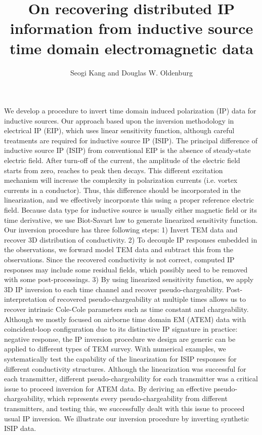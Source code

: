 \documentclass[extra,mreferee]{gji}
\author{Seogi Kang and Douglas W. Oldenburg}
\title{On recovering distributed IP information from inductive source time domain electromagnetic data}
\begin{document}
\label{firstpage}

\maketitle

\begin{summary}
We develop a procedure to invert time domain induced polarization (IP) data for inductive sources. 
Our approach based upon the inversion methodology in electrical IP (EIP), which uses linear sensitivity function, although careful treatments are required for inductive source IP (ISIP). 
The principal difference of inductive source IP (ISIP) from conventional EIP is the absence of steady-state electric field. 
After turn-off of the current, the amplitude of the electric field starts from zero, reaches to peak then decays. 
This different excitation mechanism will increase the complexity in polarization currents (i.e. vortex currents in a conductor).
Thus, this difference should be incorporated in the linearization, and we effectively incorporate this using a proper reference electric field. 
Because data type for inductive source is usually either magnetic field or its time derivative, we use Biot-Savart law to generate linearized sensitivity function. 
Our inversion procedure has three following steps:
1) Invert TEM data and recover 3D distribution of conductivity.
2) To decouple IP responses embedded in the observations, we forward model TEM data and subtract this from the observations. Since the recovered conductivity is not correct, computed IP responses may include some residual fields, which possibly need to be removed with some post-processings. 
3) By using linearized sensitivity function, we apply 3D IP inversion to each time channel and recover pseudo-chargeability. Post-interpretation of recovered pseudo-chargeability at multiple times allows us to recover intrinsic Cole-Cole parameters such as time constant and chargeability. 
Although we mostly focused on airborne time domain EM (ATEM) data with coincident-loop configuration due to its distinctive IP signature in practice: negative response, the IP inversion procedure we design are generic can be applied to different types of TEM survey. 
With numerical examples, we systematically test the capability of the linearization for ISIP responses for different conductivity structures. 
Although the linearization was successful for each transmitter, different pseudo-chargeability for each transmitter was a critical issue to proceed inversion for ATEM data. 
By deriving an effective pseudo-chargeability, which represents every pseudo-chargeability from different transmitters, and testing this, we successfully dealt with this issue to proceed usual IP inversion. 
We illustrate our inversion procedure by inverting synthetic ISIP data.
\end{summary}
\end{document}

